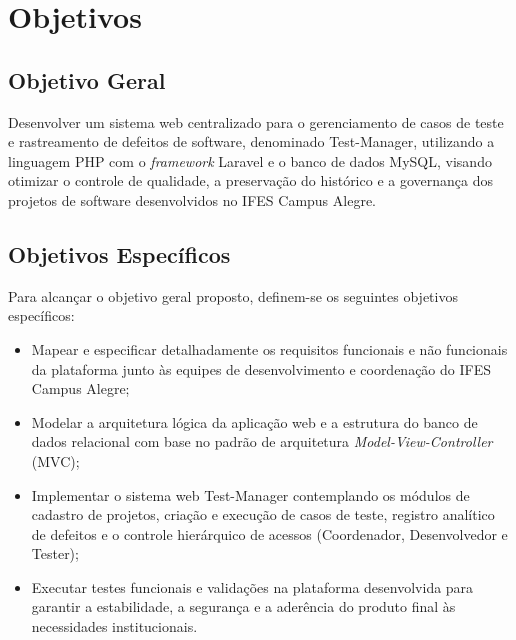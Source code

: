 \section{Objetivos}

\subsection{Objetivo Geral}
Desenvolver um sistema web centralizado para o gerenciamento de casos de teste e rastreamento de defeitos de software, denominado Test-Manager, utilizando a linguagem PHP com o \textit{framework} Laravel e o banco de dados MySQL, visando otimizar o controle de qualidade, a preservação do histórico e a governança dos projetos de software desenvolvidos no IFES Campus Alegre.

\subsection{Objetivos Específicos}
Para alcançar o objetivo geral proposto, definem-se os seguintes objetivos específicos:

\begin{itemize}
    \item Mapear e especificar detalhadamente os requisitos funcionais e não funcionais da plataforma junto às equipes de desenvolvimento e coordenação do IFES Campus Alegre;
    \item Modelar a arquitetura lógica da aplicação web e a estrutura do banco de dados relacional com base no padrão de arquitetura \textit{Model-View-Controller} (MVC);
    \item Implementar o sistema web Test-Manager contemplando os módulos de cadastro de projetos, criação e execução de casos de teste, registro analítico de defeitos e o controle hierárquico de acessos (Coordenador, Desenvolvedor e Tester);
    \item Executar testes funcionais e validações na plataforma desenvolvida para garantir a estabilidade, a segurança e a aderência do produto final às necessidades institucionais.
\end{itemize}

